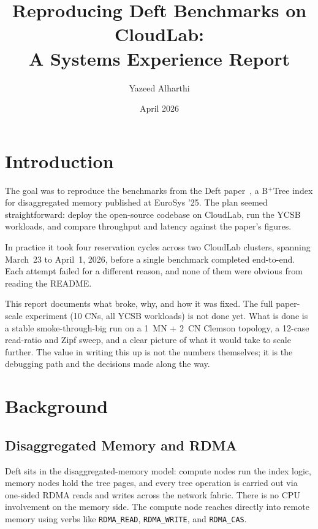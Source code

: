 \documentclass[10pt]{article}
\title{Reproducing Deft Benchmarks on CloudLab:\\A Systems Experience Report}
\author{Yazeed Alharthi}
\date{April 2026}
\begin{document}
\maketitle

\section{Introduction}

The goal was to reproduce the benchmarks from the Deft paper~\cite{deft2025eurosys},
a B$^+$Tree index for disaggregated memory published at EuroSys '25.
The plan seemed straightforward: deploy the open-source codebase on CloudLab,
run the YCSB workloads, and compare throughput and latency against the paper's figures.

In practice it took four reservation cycles across two CloudLab clusters,
spanning March~23 to April~1, 2026, before a single benchmark completed end-to-end.
Each attempt failed for a different reason, and none of them were obvious from
reading the README.

This report documents what broke, why, and how it was fixed.
The full paper-scale experiment (10 CNs, all YCSB workloads) is not done yet.
What is done is a stable smoke-through-big run on a 1~MN + 2~CN Clemson topology,
a 12-case read-ratio and Zipf sweep, and a clear picture of what it would take to
scale further.
The value in writing this up is not the numbers themselves; it is the debugging
path and the decisions made along the way.

\section{Background}

\subsection{Disaggregated Memory and RDMA}

Deft sits in the disaggregated-memory model: compute nodes run the index logic,
memory nodes hold the tree pages, and every tree operation is carried out via
one-sided RDMA reads and writes across the network fabric.
There is no CPU involvement on the memory side.
The compute node reaches directly into remote memory using verbs like
\texttt{RDMA\_READ}, \texttt{RDMA\_WRITE}, and \texttt{RDMA\_CAS}.
\end{document}
